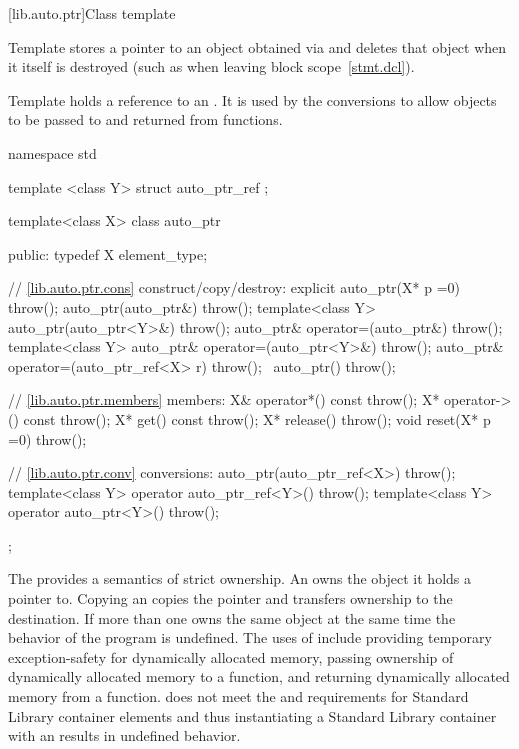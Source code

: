 [lib.auto.ptr]{Class template }

\pnum
Template  stores a pointer to an object obtained via
 and deletes that object when it itself is destroyed (such as
when leaving block scope~\ref{stmt.dcl}).

\pnum
Template  holds a reference to an .
It is used by the  conversions to allow 
objects to be passed to and returned from functions.

\begin{codeblock}
namespace std {
  template <class Y> struct auto_ptr_ref {};

  template<class X> class auto_ptr {
  public:
    typedef X element_type;

    // \ref{lib.auto.ptr.cons} construct/copy/destroy:
    explicit auto_ptr(X* p =0) throw();
    auto_ptr(auto_ptr&) throw();
    template<class Y> auto_ptr(auto_ptr<Y>&) throw();
    auto_ptr& operator=(auto_ptr&) throw();
    template<class Y> auto_ptr& operator=(auto_ptr<Y>&) throw();
    auto_ptr& operator=(auto_ptr_ref<X> r) throw();
   ~auto_ptr() throw();

    // \ref{lib.auto.ptr.members} members:
    X& operator*() const throw();
    X* operator->() const throw();
    X* get() const throw();
    X* release() throw();
    void reset(X* p =0) throw();

    // \ref{lib.auto.ptr.conv} conversions:
    auto_ptr(auto_ptr_ref<X>) throw();
    template<class Y> operator auto_ptr_ref<Y>() throw();
    template<class Y> operator auto_ptr<Y>() throw();
  };
}
\end{codeblock}

\pnum
The  provides a semantics of strict ownership. An 
owns the object it holds a pointer to. Copying an  copies the
pointer and transfers ownership to the destination. If more than one
 owns the same object at the same time the behavior of the
program is undefined.
\enternote 
The uses of  include providing temporary exception-safety
for dynamically allocated memory, passing ownership of dynamically allocated
memory to a function, and returning dynamically allocated memory from a function.
 does not meet the  and 
requirements for Standard Library container elements and thus instantiating
a Standard Library container with an  results in
undefined behavior.
\exitnoteb

